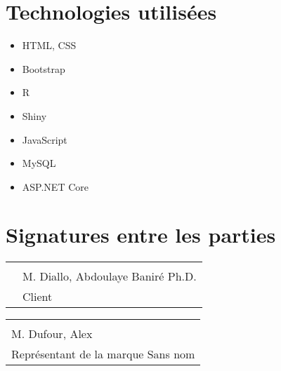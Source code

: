 \documentclass[letter,12pt]{exam}
\begin{document}
\section{Technologies utilisées}

\begin{itemize}
\tightlist
\item
  HTML, CSS
\item
  Bootstrap
\item
  R
\item
  Shiny
\item
  JavaScript
\item
  MySQL
\item
  ASP.NET Core
\end{itemize}

\section{Signatures entre les parties}

\vspace{1cm}

\begin{tabular}{@{}p{0.2cm}p{4in}@{}}
& \hrulefill \\
& M. Diallo, Abdoulaye Baniré Ph.D. \\
& Client\\
\end{tabular}

\vspace{1cm}

\begin{tabular}{@{}p{4in}@{}}
\hrulefill \\
M. Dufour, Alex \\
Représentant de la marque Sans nom\\
\end{tabular}
\end{document}
